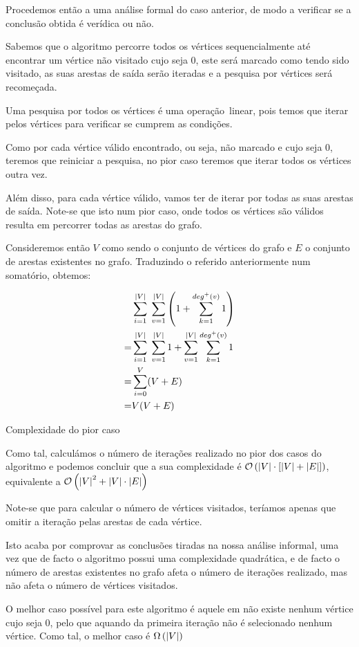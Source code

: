 Procedemos então a uma análise formal do caso anterior, de modo a
verificar se a conclusão obtida é verídica ou não.

Sabemos que o algoritmo percorre todos os vértices sequencialmente até encontrar
um vértice não visitado cujo  seja 0, este será marcado como
tendo sido visitado, as suas arestas de saída serão iteradas e a pesquisa por
vértices será recomeçada.

Uma pesquisa por todos os vértices é uma operação linear, pois temos que iterar
pelos vértices para verificar se cumprem as condições.

Como por cada vértice válido encontrado, ou seja, não marcado e cujo
 seja 0, teremos que reiniciar a pesquisa, no pior caso
teremos que iterar todos os vértices outra vez.

Além disso, para cada vértice válido, vamos ter de iterar por todas as suas
arestas de saída. Note-se que isto num pior caso, onde todos os vértices são
válidos resulta em percorrer todas as arestas do grafo.

Consideremos então $V$ como sendo o conjunto de vértices do grafo e $E$ o
conjunto de arestas existentes no grafo. Traduzindo o referido anteriormente num
somatório, obtemos:

\begin{listing}[H]
	\begin{align}
		  & \sum_{i = 1}^{\norm{V}} \; \sum_{v=1}^{\norm{V}}
		\left( 1 + \sum_{k=1}^{deg^+(v)} 1 \right)             \\
		= & \sum_{i = 1}^{\norm{V}} \; \sum_{v=1}^{\norm{V}} 1
		+ \sum_{v=1}^{\norm{V}} \sum_{k=1}^{deg^+(v)} 1        \\
		= & \sum_{i=0}^{V} (V + E)                             \\
		= & V(V+E)
	\end{align}
	\caption{Complexidade do pior caso}
\end{listing}

Como tal, calculámos o número de iterações realizado no pior dos
casos do algoritmo e podemos concluir que a sua complexidade é
$\mathcal{O}\left(\left\lvert V \right\rvert \cdot \left[ \left\lvert V \right\rvert + \left\lvert E \right\rvert \right] \right)$,
equivalente a
$\mathcal{O}\left(\left\lvert V \right\rvert^2 + \left\lvert V \right\rvert \cdot \left\lvert E \right\rvert \right)$

Note-se que para calcular o número de vértices visitados, teríamos apenas que
omitir a iteração pelas arestas de cada vértice.

Isto acaba por comprovar as conclusões tiradas na nossa análise informal, uma
vez que de facto o algoritmo possui uma complexidade quadrática, e de facto o
número de arestas existentes no grafo afeta o número de iterações realizado, mas
não afeta o número de vértices visitados.

O melhor caso possível para este algoritmo é aquele em não existe
nenhum vértice cujo  seja 0, pelo que aquando da
primeira iteração não é selecionado nenhum vértice. Como tal, o
melhor caso é $\Omega\left(\left\lvert V \right\rvert\right)$
